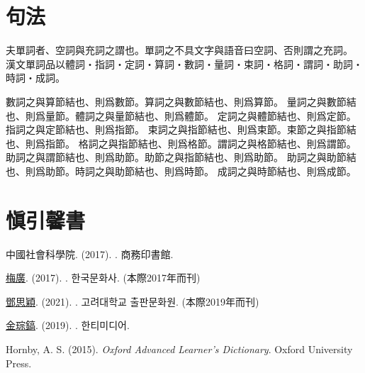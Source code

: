 \chapter{句法}
\par 夫單詞者、空詞與充詞之謂也。單詞之不具文字與語音曰空詞、否則謂之充詞。
漢文單詞品以體詞・指詞・定詞・算詞・數詞・量詞・束詞・格詞・謂詞・助詞・時詞・成詞。
\par 
數詞之與算節結也、則爲數節。算詞之與數節結也、則爲算節。
量詞之與數節結也、則爲量節。體詞之與量節結也、則爲體節。
定詞之與體節結也、則爲定節。指詞之與定節結也、則爲指節。
束詞之與指節結也、則爲束節。束節之與指節結也、則爲指節。
格詞之與指節結也、則爲格節。謂詞之與格節結也、則爲謂節。
助詞之與謂節結也、則爲助節。助節之與指節結也、則爲助節。
助詞之與助節結也、則爲助節。時詞之與助節結也、則爲時節。
成詞之與時節結也、則爲成節。
\chapter{愼引馨書}
\par 中國社會科學院. (2017). . 商務印書館.
\par \underline{梅廣}. (2017). . 한국문화사. (本際2017年而刊)
\par \underline{鄧思穎}. (2021). . 고려대학교 출판문화원. (本際2019年而刊)
\par \underline{金琮鎬}. (2019). . 한티미디어.
\par Hornby, A. S. (2015). \textit{Oxford Advanced Learner's Dictionary}. Oxford University Press.
